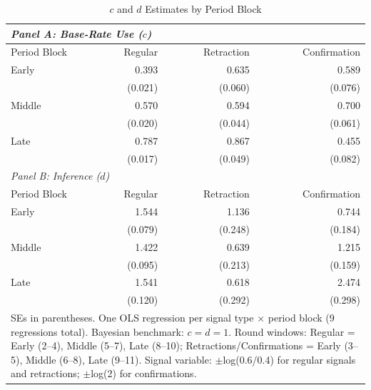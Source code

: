 \begin{table}[htbp]
\centering
\caption{$c$ and $d$ Estimates by Period Block}
\label{tab:cd_by_period}
\begin{tabular}{lrrr}
\hline
\multicolumn{4}{l}{\textit{Panel A: Base-Rate Use ($c$)}} \\
\hline
Period Block & Regular & Retraction & Confirmation \\
\hline
Early & 0.393 & 0.635 & 0.589
 \\
 & (0.021) & (0.060) & (0.076)
 \\
Middle & 0.570 & 0.594 & 0.700
 \\
 & (0.020) & (0.044) & (0.061)
 \\
Late & 0.787 & 0.867 & 0.455
 \\
 & (0.017) & (0.049) & (0.082)
 \\
\hline

\multicolumn{4}{l}{\textit{Panel B: Inference ($d$)}} \\
\hline
Period Block & Regular & Retraction & Confirmation \\
\hline
Early & 1.544 & 1.136 & 0.744
 \\
 & (0.079) & (0.248) & (0.184)
 \\
Middle & 1.422 & 0.639 & 1.215
 \\
 & (0.095) & (0.213) & (0.159)
 \\
Late & 1.541 & 0.618 & 2.474
 \\
 & (0.120) & (0.292) & (0.298)
 \\
\hline

\multicolumn{4}{p{0.85\textwidth}}{\small SEs in parentheses. One OLS regression per signal type $\times$ period block (9 regressions total). Bayesian benchmark: $c=d=1$. Round windows: Regular = Early (2--4), Middle (5--7), Late (8--10); Retractions/Confirmations = Early (3--5), Middle (6--8), Late (9--11). Signal variable: $\pm$log(0.6/0.4) for regular signals and retractions; $\pm$log(2) for confirmations.} \\
\end{tabular}
\end{table}
